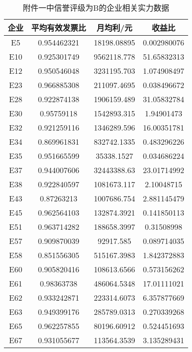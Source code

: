 \documentclass{cumcmthesis}
\begin{document}
\begin{appendices}
\begin{table}[H]   %
	\caption{附件一中信誉评级为B的企业相关实力数据}\label{tab:003} \centering
	\begin{tabular}{cccc}
		\toprule[1.5pt]
		企业 & 平均有效发票比     & 月均利/元           & 收益比          \\
		\midrule[1pt]
		E5   & 0.954462321 & 18198.08895  & 0.002980076  \\
		E10  & 0.925301749 & 9562118.778  & 51.65832313  \\
		E12  & 0.950546048 & 3231195.703  & 1.074908497  \\
		E23  & 0.966885308 & 211097.4695  & 0.038496672  \\
		E28  & 0.922874138 & 1906159.489  & 31.05832784  \\
		E30  & 0.95759118  & 1542893.315  & 1.94901473   \\
		E32  & 0.921259116 & 1346289.596  & 16.00351781  \\
		E34  & 0.869961831 & 832742.1335  & 0.483296226  \\
		E35  & 0.951665599 & 35338.1527   & 0.034686224  \\
		E37  & 0.944007606 & 32443388.63  & 23.01714992  \\
		E38  & 0.922840597 & 1081673.117  & 2.10048715   \\
		E43  & 0.87263213  & 1007686.754  & 2.881145479  \\
		E45  & 0.962564103 & 132874.3921  & 0.141850113  \\
		E51  & 0.963714282 & 188658.3997  & 0.31508998   \\
		E57  & 0.909870039 & 92917.585    & 0.089714035  \\
		E58  & 0.851556305 & 515167.3983  & 1.842372883  \\
		E60  & 0.905820416 & 108613.6566  & 0.573156262  \\
		E61  & 0.98363738  & 486064.5348  & 17.01111021  \\
		E62  & 0.933242871 & 223314.6073  & 6.357877669  \\
		E63  & 0.949399176 & 285789.0313  & 0.270339268  \\
		E65  & 0.962257855 & 80196.60912  & 0.524451693  \\
		E67  & 0.931055677 & 113564.3539  & 3.135289431  \\
		\bottomrule[1.5pt]
\end{tabular}
\end{table}
		

\end{appendices}
\end{document}
